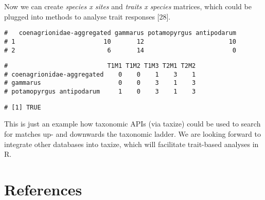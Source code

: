 Now we can create \emph{species x sites} and \emph{traits x species} matrices, which could be plugged into methods to analyse trait responses [28].


\begin{knitrout}
\color{fgcolor}\small\begin{kframe}
\begin{alltt}
\hlopt{$} \hlkwb{<-} \hlopt{$}\hlstd{traits[}\hlstd{(}\hlopt{$}\hlopt{$}\hlstd{taxon)]}
 \hlkwb{<-}  \hlopt{~}    
           \hlstd{=} \hlstd{)}
 \hlkwb{<-} \hlopt{$}
\hlopt{$} \hlkwb{<-} 
\end{alltt}
\begin{verbatim}
#   coenagrionidae-aggregated gammarus potamopyrgus antipodarum
# 1                        10       12                       10
# 2                         6       14                        0
\end{verbatim}
\begin{alltt}
 \hlkwb{<-} \hlstd{traits[,} \hlopt{:}\hlstd{][}\hlstd{(}\hlopt{$}\hlstd{taxon_cleaned), ]}
 \hlkwb{<-} \hlopt{$}
\hlopt{$} \hlkwb{<-} 
\end{alltt}
\begin{verbatim}
#                           T1M1 T1M2 T1M3 T2M1 T2M2
# coenagrionidae-aggregated    0    0    1    3    1
# gammarus                     0    0    3    1    3
# potamopyrgus antipodarum     1    0    3    1    3
\end{verbatim}
\begin{alltt}
\hlstd{(} \hlopt{==} 
\end{alltt}
\begin{verbatim}
# [1] TRUE
\end{verbatim}
\end{kframe}
\end{knitrout}


This is just an example how taxonomic APIs (via taxize) could be used to search for matches up- and downwards the taxonomic ladder. We are looking forward to integrate other databases into taxize, which will facilitate trait-based analyses in R.


\section*{References}
\printbibliography[heading=none]
